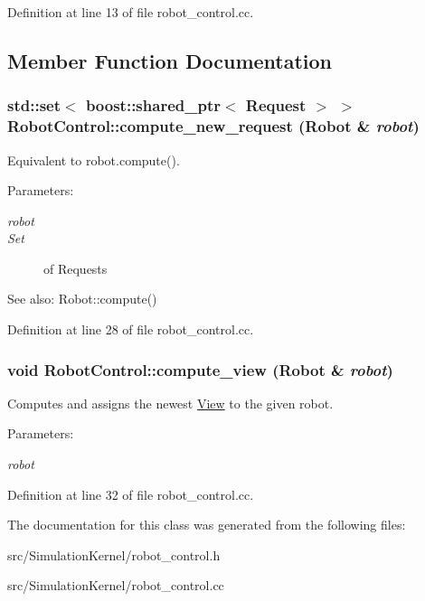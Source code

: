 Definition at line 13 of file robot\_\-control.cc.

\subsection{Member Function Documentation}
\hypertarget{class_robot_control_55c97895d6d2a895ce67ecd118e7f1a0}{
\subsubsection[compute\_\-new\_\-request]{\setlength{\rightskip}{0pt plus 5cm}std::set$<$ boost::shared\_\-ptr$<$ {\bf Request} $>$ $>$ RobotControl::compute\_\-new\_\-request (Robot \& {\em robot})}}
\label{class_robot_control_55c97895d6d2a895ce67ecd118e7f1a0}


Equivalent to robot.compute(). \begin{Desc}
\item[Parameters:]
\begin{description}
\item[{\em robot}]\item[{\em Set}]of Requests \end{description}
\end{Desc}
\begin{Desc}
\item[See also:]Robot::compute() \end{Desc}


Definition at line 28 of file robot\_\-control.cc.\hypertarget{class_robot_control_368f64b670eb9b3dd9488616832cafa9}{
\subsubsection[compute\_\-view]{\setlength{\rightskip}{0pt plus 5cm}void RobotControl::compute\_\-view (Robot \& {\em robot})}}
\label{class_robot_control_368f64b670eb9b3dd9488616832cafa9}


Computes and assigns the newest \hyperlink{class_view}{View} to the given robot. \begin{Desc}
\item[Parameters:]
\begin{description}
\item[{\em robot}]\end{description}
\end{Desc}


Definition at line 32 of file robot\_\-control.cc.

The documentation for this class was generated from the following files:\begin{CompactItemize}
\item 
src/SimulationKernel/robot\_\-control.h\item 
src/SimulationKernel/robot\_\-control.cc\end{CompactItemize}

